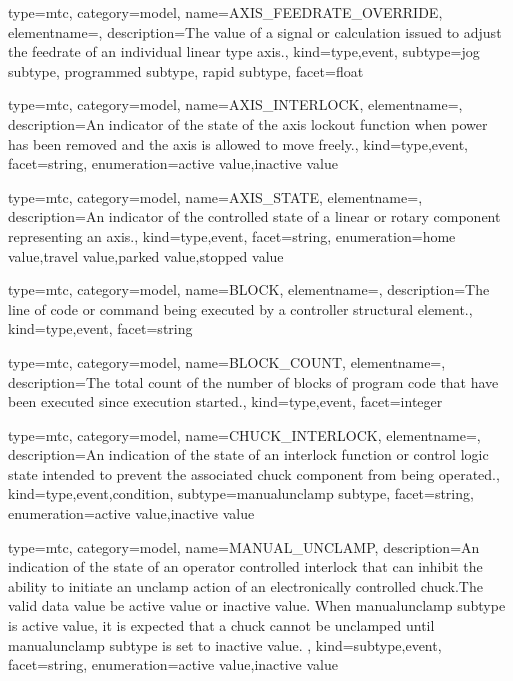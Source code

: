 {
  type=mtc,
  category=model,
  name={AXIS\_FEEDRATE\_OVERRIDE},
  elementname=,
  description={The value of a signal or calculation issued to adjust the feedrate of an individual linear type axis.},
  kind={type,event},
  subtype={\gls{jog subtype}, \gls{programmed subtype}, \gls{rapid subtype}},
  facet={\gls{float}}
}



{
  type=mtc,
  category=model,
  name={AXIS\_INTERLOCK},
  elementname=,
  description={An indicator of the state of the axis lockout function when power has been removed and the axis is allowed to move freely.},
  kind={type,event},
  facet={\gls{string}},
  enumeration={\gls{active value},\gls{inactive value}}
}


{
  type=mtc,
  category=model,
  name={AXIS\_STATE},
  elementname=,
  description={An indicator of the controlled state of a \gls{linear} or \gls{rotary} component representing an axis.},
  kind={type,event},
  facet={\gls{string}},
  enumeration={\gls{home value},\gls{travel value},\gls{parked value},\gls{stopped value}}
}


{
  type=mtc,
  category=model,
  name={BLOCK},
  elementname=,
  description={The line of code or command being executed by a \gls{controller} \gls{structural element}.},
  kind={type,event},
  facet={\gls{string}}
}


{
  type=mtc,
  category=model,
  name={BLOCK\_COUNT},
  elementname=,
  description={The total count of the number of blocks of program code that have been executed since execution started.},
  kind={type,event},
  facet={\gls{integer}}
}


{
  type=mtc,
  category=model,
  name={CHUCK\_INTERLOCK},
  elementname=,
  description={An indication of the state of an interlock function or control logic state intended to prevent the associated \gls{chuck} component from being operated.},
  kind={type,event,condition},
  subtype={\gls{manualunclamp subtype}},
  facet={\gls{string}},
  enumeration={\gls{active value},\gls{inactive value}}
}


{
  type=mtc,
  category=model,
  name={MANUAL\_UNCLAMP},
  description={An indication of the state of an operator controlled interlock that can inhibit the ability to initiate an unclamp action of an electronically controlled chuck.\newline The \gls{valid data value} \must be \gls{active value} or \gls{inactive value}. \newline When \gls{manualunclamp subtype} is \gls{active value}, it is expected that a chuck cannot be unclamped until \gls{manualunclamp subtype} is set to \gls{inactive value}. },
  kind={subtype,event},
  facet={\gls{string}},
  enumeration={\gls{active value},\gls{inactive value}}
}


